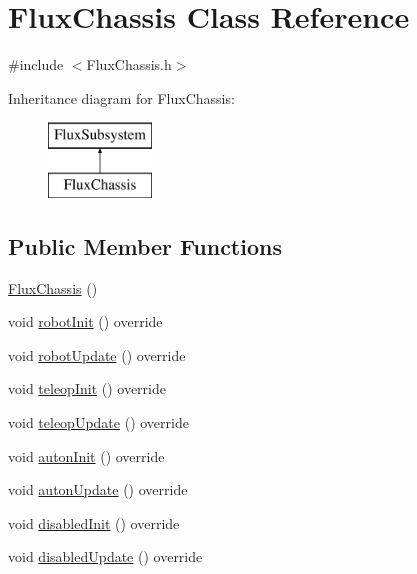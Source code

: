 \hypertarget{classFluxChassis}{}\section{Flux\+Chassis Class Reference}
\label{classFluxChassis}


{\ttfamily \#include $<$Flux\+Chassis.\+h$>$}

Inheritance diagram for Flux\+Chassis\+:\begin{figure}[H]
\begin{center}
\leavevmode
\includegraphics[height=2.000000cm]{classFluxChassis}
\end{center}
\end{figure}
\subsection*{Public Member Functions}
\begin{DoxyCompactItemize}
\item 
\hyperlink{classFluxChassis_a5f66d5b8ea384c006de49dfb602fdec8}{Flux\+Chassis} ()
\item 
void \hyperlink{classFluxChassis_a32d9d7767f8ce15fdd10f8116145e408}{robot\+Init} () override
\item 
void \hyperlink{classFluxChassis_ad76138955ede1324ba7d4da824cb39f3}{robot\+Update} () override
\item 
void \hyperlink{classFluxChassis_af0c4310e2c5cf06b68b4ca6a740ca406}{teleop\+Init} () override
\item 
void \hyperlink{classFluxChassis_af7ec99f668e784fec47bb2bea24fff63}{teleop\+Update} () override
\item 
void \hyperlink{classFluxChassis_acdfad6bb4b5cc6e5c03e8e8ab5879c52}{auton\+Init} () override
\item 
void \hyperlink{classFluxChassis_a2298a26f376a4b7d73da84f33b68642e}{auton\+Update} () override
\item 
void \hyperlink{classFluxChassis_a12226856b3b697fe9b5649950083d289}{disabled\+Init} () override
\item 
void \hyperlink{classFluxChassis_a1d3d201e0761cd75a3eb5bab58ea1fb2}{disabled\+Update} () override
\end{DoxyCompactItemize}


